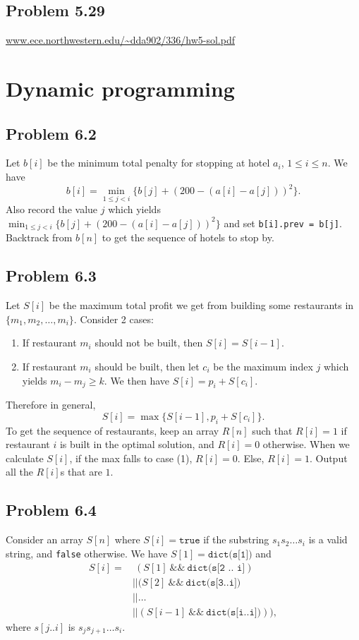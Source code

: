\documentclass[12pt]{report}
\newcommand{\co}{\texttt}
\renewcommand{\and}{\ \&\& \ }
\begin{document}
\section{Problem 5.29}
\url{www.ece.northwestern.edu/~dda902/336/hw5-sol.pdf}

\chapter[Chapter 6 Solution]{Dynamic programming}
\section{Problem 6.2}
Let $b[i]$ be the minimum total penalty for stopping at hotel $a_i$, $1 \le i \le n$. We have $$b[i] = \min_{1 \le j < i} \{ b[j] + (200 - (a[i] - a[j]))^2\}.$$
Also record the value $j$ which yields $\displaystyle \min_{1 \le j < i} \{ b[j] + (200 - (a[i] - a[j]))^2\}$ and set \co{b[i].prev = b[j]}. Backtrack from $b[n]$ to get the sequence of hotels to stop by.


\section{Problem 6.3}
Let $S[i]$ be the maximum total profit we get from building some restaurants in $\{m_1, m_2, \ldots, m_i\}$. Consider 2 cases:
\begin{enumerate}[(1)]
  \item If restaurant $m_i$ should not be built, then $S[i] = S[i-1]$.
  \item If restaurant $m_i$ should be built, then let $c_i$ be the maximum index $j$ which yields $m_i - m_j \ge k$. We then have $\displaystyle S[i] = p_i + S[c_i]$.
\end{enumerate}
Therefore in general, $$S[i] = \max \{ S[i-1], p_i + S[c_i]\}.$$
To get the sequence of restaurants, keep an array $R[n]$ such that $R[i] = 1$ if restaurant $i$ is built in the optimal solution, and $R[i] = 0$ otherwise. When we calculate $S[i]$, if the max falls to case (1), $R[i] = 0$. Else, $R[i] = 1$. Output all the $R[i]$s that are $1$.

\section{Problem 6.4}
Consider an array $S[n]$ where $S[i] = \co{true}$ if the substring $s_1 s_2 \ldots s_i$ is a valid string, and \co{false} otherwise. We have $S[1] = \co{dict(s[1])}$ and 
$$
\begin{aligned}
S[i] = & \ (S[1] \and \co{dict(s[2 .. i]}) \\ 
& || (S[2] \and \co{dict(s[3..i])} \\ 
& || \ldots \\
& || (S[i-1] \and \co{dict(s[i..i])})), 
\end{aligned}$$
where $s[j..i]$ is $s_j s_{j+1} \ldots s_i$.
\end{document}
